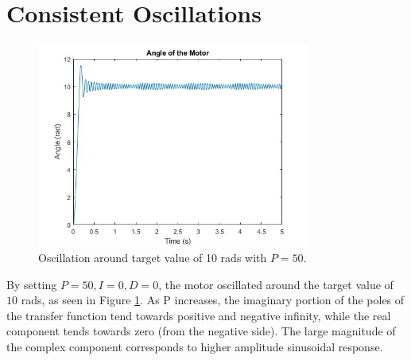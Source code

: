\section{Consistent Oscillations}
\begin{figure}[H]
	\centering
	\includegraphics[width=0.8\textwidth]{./figures/lab3_P_only_osscilation.jpg}
	\caption{Oscillation around target value of 10 rads with $P = 50$. }
	\label{fig:Oscillation}
\end{figure}
By setting \(P = 50, I = 0, D = 0\), the motor oscillated around the target value of \(10 \) rads, as seen in Figure \ref{fig:Oscillation}. As P increases, the imaginary portion of the poles of the transfer function tend towards positive and negative infinity, while the real component tends towards zero (from the negative side). The large magnitude of the complex component corresponds to higher amplitude sinusoidal response.

